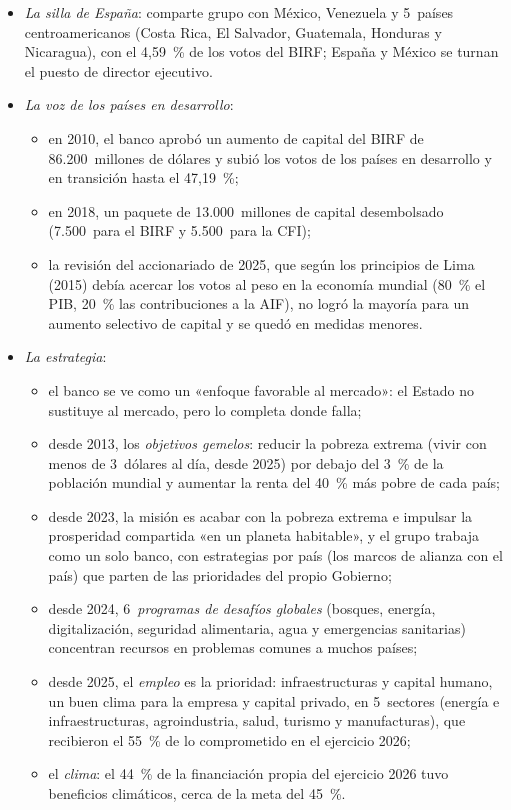 \documentclass[11pt]{article}
\begin{document}
\begin{itemize}
\item \emph{La silla de España}: comparte grupo con México, Venezuela y 5~países centroamericanos (Costa Rica, El Salvador, Guatemala, Honduras y Nicaragua), con el 4,59~\% de los votos del BIRF; España y México se turnan el puesto de director ejecutivo\nocite{BM2026Directores}.
\item \emph{La voz de los países en desarrollo}:
  \begin{itemize}
  \item en 2010, el banco aprobó un aumento de capital del BIRF de 86.200~millones de dólares y subió los votos de los países en desarrollo y en transición hasta el 47,19~\%\nocite{BM2010Voz};
  \item en 2018, un paquete de 13.000~millones de capital desembolsado (7.500~para el BIRF y 5.500~para la CFI)\nocite{BM2018Capital};
  \item la revisión del accionariado de 2025, que según los principios de Lima (2015) debía acercar los votos al peso en la economía mundial (80~\% el PIB, 20~\% las contribuciones a la AIF), no logró la mayoría para un aumento selectivo de capital y se quedó en medidas menores\nocite{CD2026Accionariado}.
  \end{itemize}
\item \emph{La estrategia}:
  \begin{itemize}
  \item el banco se ve como un «enfoque favorable al mercado»: el Estado no sustituye al mercado, pero lo completa donde falla;
  \item desde 2013, los \emph{objetivos gemelos}: reducir la pobreza extrema (vivir con menos de 3~dólares al día, desde 2025) por debajo del 3~\% de la población mundial y aumentar la renta del 40~\% más pobre de cada país\nocite{BM2025Pobreza};
  \item desde 2023, la misión es acabar con la pobreza extrema e impulsar la prosperidad compartida «en un planeta habitable», y el grupo trabaja como un solo banco, con estrategias por país (los marcos de alianza con el país) que parten de las prioridades del propio Gobierno;
  \item desde 2024, 6~\emph{programas de desafíos globales} (bosques, energía, digitalización, seguridad alimentaria, agua y emergencias sanitarias) concentran recursos en problemas comunes a muchos países\nocite{BM2024Desafios};
  \item desde 2025, el \emph{empleo} es la prioridad: infraestructuras y capital humano, un buen clima para la empresa y capital privado, en 5~sectores (energía e infraestructuras, agroindustria, salud, turismo y manufacturas), que recibieron el 55~\% de lo comprometido en el ejercicio 2026\nocite{BM2026Empleo};
  \item el \emph{clima}: el 44~\% de la financiación propia del ejercicio 2026 tuvo beneficios climáticos, cerca de la meta del 45~\%\nocite{BM2026Clima}.
  \end{itemize}
\end{itemize}
\end{document}
